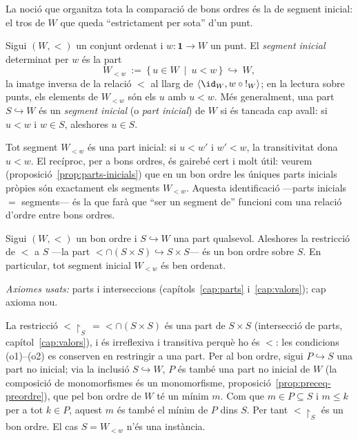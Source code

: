 La noció que organitza tota la comparació de bons ordres és la de segment
inicial: el tros de \(W\) que queda \enquote{estrictament per sota} d'un
punt.

\begin{definicio}\label{def:segment}
Sigui \((W,<)\) un conjunt ordenat i \(w\colon\mathbf1\to W\) un punt. El
\emph{segment inicial} determinat per \(w\) és la part
\[
W_{<w}\ :=\ \{\,u\in W\ \mid\ u<w\,\}\ \hookrightarrow\ W,
\]
la imatge inversa de la relació \({<}\) al llarg de
\(\langle\id_W,w\circ{!}_W\rangle\); en la lectura sobre punts, els elements
de \(W_{<w}\) són els \(u\) amb \(u<w\). Més generalment, una part
\(S\hookrightarrow W\) és un \emph{segment inicial} (o \emph{part inicial})
de \(W\) si és tancada cap avall: si \(u<w\) i \(w\in S\), aleshores \(u\in
S\).
\end{definicio}

\begin{observacio}\label{obs:segments-inicials}
Tot segment \(W_{<w}\) és una part inicial: si \(u<w'\) i \(w'<w\), la
transitivitat dona \(u<w\). El recíproc, per a bons ordres, és gairebé cert i
molt útil: veurem (proposició~\ref{prop:parts-inicials}) que en un bon ordre
les úniques parts inicials pròpies són exactament els segments \(W_{<w}\).
Aquesta identificació ---parts inicials \(=\) segments--- és la que farà que
\enquote{ser un segment de} funcioni com una relació d'ordre entre bons
ordres.
\end{observacio}

\begin{proposicio}\label{prop:segment-ben-ordenat}
Sigui \((W,<)\) un bon ordre i \(S\hookrightarrow W\) una part qualsevol.
Aleshores la restricció de \({<}\) a \(S\) ---la part
\({<}\cap(S\times S)\hookrightarrow S\times S\)--- és un bon ordre sobre
\(S\). En particular, tot segment inicial \(W_{<w}\) és ben ordenat.\par
\emph{Axiomes usats:} parts i interseccions (capítols~\ref{cap:parts}
i~\ref{cap:valors}); cap axioma nou.
\end{proposicio}

\begin{prova}
La restricció \({<}\!\restriction_S\,={<}\cap(S\times S)\) és una part de
\(S\times S\) (intersecció de parts, capítol~\ref{cap:valors}), i és
irreflexiva i transitiva perquè ho és \({<}\): les condicions (o1)--(o2) es
conserven en restringir a una part. Per al bon ordre, sigui
\(P\hookrightarrow S\) una part no inicial; via la inclusió
\(S\hookrightarrow W\), \(P\) és també una part no inicial de \(W\)
(la composició de monomorfismes és un monomorfisme,
proposició~\ref{prop:preceq-preordre}), que pel bon ordre de \(W\) té un
mínim \(m\). Com que \(m\in P\subseteq S\) i \(m\le k\) per a tot \(k\in
P\), aquest \(m\) és també el mínim de \(P\) dins \(S\). Per tant
\({<}\!\restriction_S\) és un bon ordre. El cas \(S=W_{<w}\) n'és una
instància.
\end{prova}

